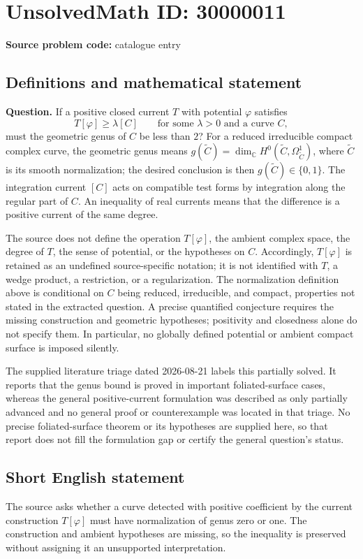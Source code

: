 \documentclass[11pt]{article}
\newcommand{\C}{\mathbb{C}}
\begin{document}
\section*{UnsolvedMath ID: 30000011}
\textbf{Source problem code:} catalogue entry
\subsection{Definitions and mathematical statement}
\textbf{Question.} If a positive closed current \(T\) with potential \(\varphi\) satisfies\[T[\varphi]\ge\lambda[C]\qquad\text{for some }\lambda>0\text{ and a curve }C,\] must the geometric genus of \(C\) be less than \(2\)? For a reduced irreducible compact complex curve, the geometric genus means \(g(\widetilde C)=\dim_{\C}H^0(\widetilde C,\Omega^1_{\widetilde C})\), where \(\widetilde C\) is its smooth normalization; the desired conclusion is then \(g(\widetilde C)\in\{0,1\}\). The integration current \([C]\) acts on compatible test forms by integration along the regular part of \(C\). An inequality of real currents means that the difference is a positive current of the same degree.\par The source does not define the operation \(T[\varphi]\), the ambient complex space, the degree of \(T\), the sense of potential, or the hypotheses on \(C\). Accordingly, \(T[\varphi]\) is retained as an undefined source-specific notation; it is not identified with \(T\), a wedge product, a restriction, or a regularization. The normalization definition above is conditional on \(C\) being reduced, irreducible, and compact, properties not stated in the extracted question. A precise quantified conjecture requires the missing construction and geometric hypotheses; positivity and closedness alone do not specify them. In particular, no globally defined potential or ambient compact surface is imposed silently.\par The supplied literature triage dated 2026-08-21 labels this partially solved. It reports that the genus bound is proved in important foliated-surface cases, whereas the general positive-current formulation was described as only partially advanced and no general proof or counterexample was located in that triage. No precise foliated-surface theorem or its hypotheses are supplied here, so that report does not fill the formulation gap or certify the general question's status.
\subsection{Short English statement}
The source asks whether a curve detected with positive coefficient by the current construction \(T[\varphi]\) must have normalization of genus zero or one. The construction and ambient hypotheses are missing, so the inequality is preserved without assigning it an unsupported interpretation.
\end{document}
